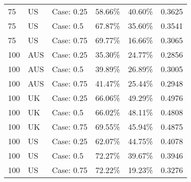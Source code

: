 \begin{table}[ht]
\begin{tabular}{llllll}
  75 & US & Case: 0.25 & 58.66\% & 40.60\% & 0.3625 \\ 
  75 & US & Case: 0.5 & 67.87\% & 35.60\% & 0.3541 \\ 
  75 & US & Case: 0.75 & 69.77\% & 16.66\% & 0.3065 \\ 
  100 & AUS & Case: 0.25 & 35.30\% & 24.77\% & 0.2856 \\ 
  100 & AUS & Case: 0.5 & 39.89\% & 26.89\% & 0.3005 \\ 
  100 & AUS & Case: 0.75 & 41.47\% & 25.44\% & 0.2948 \\ 
  100 & UK & Case: 0.25 & 66.06\% & 49.29\% & 0.4976 \\ 
  100 & UK & Case: 0.5 & 66.02\% & 48.11\% & 0.4808 \\ 
  100 & UK & Case: 0.75 & 69.55\% & 45.94\% & 0.4875 \\ 
  100 & US & Case: 0.25 & 62.07\% & 44.75\% & 0.4078 \\ 
  100 & US & Case: 0.5 & 72.27\% & 39.67\% & 0.3946 \\ 
  100 & US & Case: 0.75 & 72.22\% & 19.23\% & 0.3276 \\ 
   \hline
\end{tabular}
\end{table}
